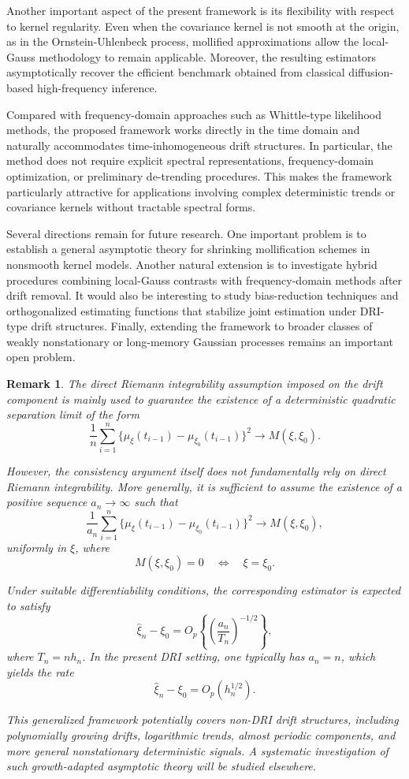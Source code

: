 \documentclass[a4paper,10pt,twoside]{article}
\newtheorem{remark}{Remark}[section]
\numberwithin{equation}{section}
\begin{document}
Another important aspect of the present framework is its flexibility with respect to kernel regularity.
Even when the covariance kernel is not smooth at the origin, as in the Ornstein-Uhlenbeck process, mollified approximations allow the local-Gauss methodology to remain applicable.
Moreover, the resulting estimators asymptotically recover the efficient benchmark obtained from classical diffusion-based high-frequency inference.

Compared with frequency-domain approaches such as Whittle-type likelihood methods, the proposed framework works directly in the time domain and naturally accommodates time-inhomogeneous drift structures.
In particular, the method does not require explicit spectral representations, frequency-domain optimization, or preliminary de-trending procedures.
This makes the framework particularly attractive for applications involving complex deterministic trends or covariance kernels without tractable spectral forms.

Several directions remain for future research.
One important problem is to establish a general asymptotic theory for shrinking mollification schemes in nonsmooth kernel models.
Another natural extension is to investigate hybrid procedures combining local-Gauss contrasts with frequency-domain methods after drift removal.
It would also be interesting to study bias-reduction techniques and orthogonalized estimating functions that stabilize joint estimation under DRI-type drift structures.
Finally, extending the framework to broader classes of weakly nonstationary or long-memory Gaussian processes remains an important open problem.


\begin{remark}
The direct Riemann integrability assumption imposed on the drift component is mainly used to guarantee the existence of a deterministic quadratic separation limit of the form
\[
\frac1n
\sum_{i=1}^n
\{\mu_\xi(t_{i-1})-\mu_{\xi_0}(t_{i-1})\}^2
\to
M(\xi,\xi_0).
\]

However, the consistency argument itself does not fundamentally rely on direct Riemann integrability.
More generally, it is sufficient to assume the existence of a positive sequence $a_n \to \infty$ such that
\[
\frac1{a_n}
\sum_{i=1}^n
\{\mu_\xi(t_{i-1})-\mu_{\xi_0}(t_{i-1})\}^2
\to
M(\xi,\xi_0),
\]
uniformly in $\xi$, where
\[
M(\xi,\xi_0)=0
\quad\Longleftrightarrow\quad
\xi=\xi_0.
\]

Under suitable differentiability conditions, the corresponding estimator is expected to satisfy
\[
\widehat{\xi}_n-\xi_0
=
O_p\left\{
\left(
\frac{a_n}{T_n}
\right)^{-1/2}
\right\},
\]
where $T_n=n h_n$.
In the present DRI setting, one typically has $a_n=n$, which yields the rate
\[
\widehat{\xi}_n-\xi_0
=
O_p(h_n^{1/2}).
\]

This generalized framework potentially covers non-DRI drift structures, including polynomially growing drifts, logarithmic trends, almost periodic components, and more general nonstationary deterministic signals.
A systematic investigation of such growth-adapted asymptotic theory will be studied elsewhere.
\end{remark}
\end{document}
